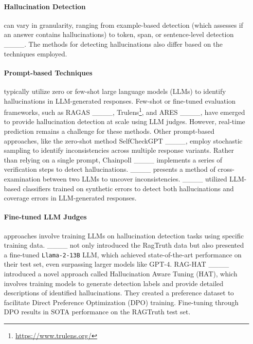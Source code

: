 \paragraph{Hallucination Detection} can vary in granularity, ranging from example-based detection (which assesses if an answer contains hallucinations) to token, span, or sentence-level detection ____. The methods for detecting hallucinations also differ based on the techniques employed.

\paragraph{Prompt-based Techniques} typically utilize zero or few-shot large language models (LLMs) to identify hallucinations in LLM-generated responses. Few-shot or fine-tuned evaluation frameworks, such as RAGAS ____, Trulens\footnote{\url{https://www.trulens.org/}}, and ARES ____, have emerged to provide hallucination detection at scale using LLM judges. However, real-time prediction remains a challenge for these methods. Other prompt-based approaches, like the zero-shot method SelfCheckGPT ____, employ stochastic sampling to identify inconsistencies across multiple response variants. Rather than relying on a single prompt, Chainpoll ____ implements a series of verification steps to detect hallucinations. ____ presents a method of cross-examination between two LLMs to uncover inconsistencies. ____ utilized LLM-based classifiers trained on synthetic errors to detect both hallucinations and coverage errors in LLM-generated responses.

\paragraph{Fine-tuned LLM Judges} approaches involve training LLMs on hallucination detection tasks using specific training data. ____ not only introduced the RagTruth data but also presented a fine-tuned \texttt{Llama-2-13B} LLM, which achieved state-of-the-art performance on their test set, even surpassing larger models like GPT-4. RAG-HAT ____ introduced a novel approach called Hallucination Aware Tuning (HAT), which involves training models to generate detection labels and provide detailed descriptions of identified hallucinations. They created a preference dataset to facilitate Direct Preference Optimization (DPO) training. Fine-tuning through DPO results in SOTA performance on the RAGTruth test set.

